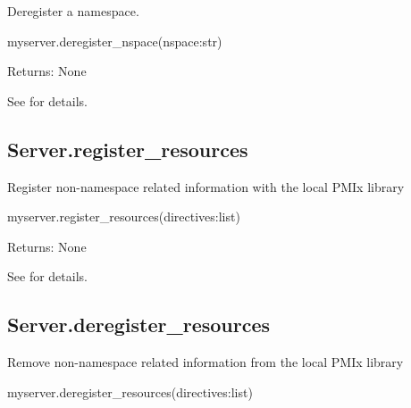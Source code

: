 \summary

Deregister a namespace.

\format

\pyspecificstart
\begin{codepar}
myserver.deregister_nspace(nspace:str)
\end{codepar}
\pyspecificend


\begin{arglist}
\end{arglist}

Returns: None

See  for details.


\subsection{Server.register_resources}

\summary

Register non-namespace related information with the local \ac{PMIx} library

\format

\pyspecificstart
\begin{codepar}
myserver.register_resources(directives:list)
\end{codepar}
\pyspecificend


\begin{arglist}
\end{arglist}

Returns: None

See  for details.


\subsection{Server.deregister_resources}

\summary

Remove non-namespace related information from the local \ac{PMIx} library

\format

\pyspecificstart
\begin{codepar}
myserver.deregister_resources(directives:list)
\end{codepar}
\pyspecificend


